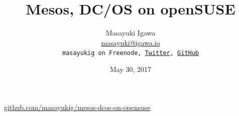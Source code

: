 \documentclass[aspectratio=169,11pt,hyperref={colorlinks=true}]{beamer}
\author[Masayuki Igawa]{%
  \texorpdfstring{%
    \centering
    Masayuki Igawa\\
    \href{mailto:masayuki@igawa.io}{masayuki@igawa.io}\\
    \texttt{masayukig on Freenode,
     \href{https://twitter.com/masayukig}{Twitter},
     \href{https://github.com/masayukig}{GitHub}}
  }
  {Masayuki Igawa}
}
\date{May 30, 2017}
\title[Mesos, DC/OS on openSUSE
\hspace{2em}\insertframenumber/\inserttotalframenumber]{Mesos, DC/OS on openSUSE}
\begin{document}


{%
\begin{frame}[noframenumbering]
  \hypersetup{colorlinks,urlcolor=suse}
  \titlepage{}
  \centering
  \href{https://github.com/masayukig/mesos-dcos-on-opensuse}{github.com/masayukig/mesos-dcos-on-opensuse}
\end{frame}
}

\end{document}

